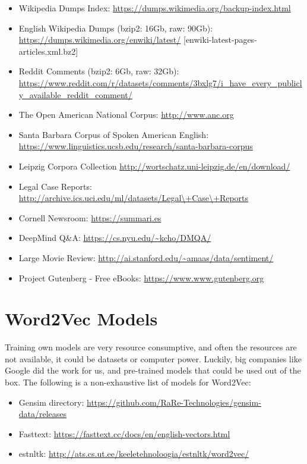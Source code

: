 \begin{itemize}
    \setlength\itemsep{0em}
    \item Wikipedia Dumps Index: \url{https://dumps.wikimedia.org/backup-index.html}
    \item English Wikipedia Dumps (bzip2: 16Gb, raw: 90Gb): \url{https://dumps.wikimedia.org/enwiki/latest/} [enwiki-latest-pages-articles.xml.bz2]
    \item Reddit Comments (bzip2: 6Gb, raw: 32Gb): \url{https://www.reddit.com/r/datasets/comments/3bxlg7/i_have_every_publicly_available_reddit_comment/}
    \item The Open American National Corpus: \url{http://www.anc.org}
    \item Santa Barbara Corpus of Spoken American English: \url{https://www.linguistics.ucsb.edu/research/santa-barbara-corpus}
    \item Leipzig Corpora Collection \url{http://wortschatz.uni-leipzig.de/en/download/}
    \item Legal Case Reports: \url{http://archive.ics.uci.edu/ml/datasets/Legal\+Case\+Reports}
    \item Cornell Newsroom: \url{https://summari.es}
    \item DeepMind Q\&A: \url{https://cs.nyu.edu/\~kcho/DMQA/}
    \item Large Movie Review: \url{http://ai.stanford.edu/\~amaas/data/sentiment/}
    \item Project Gutenberg - Free eBooks: \url{https://www.www.gutenberg.org}
\end{itemize}


\section{Word2Vec Models}
Training own models are very resource consumptive, and often the resources are not available, it could be datasets or computer power. Luckily, big companies like Google did the work for us, and pre-trained models that could be used out of the box. The following is a non-exhaustive list of models for Word2Vec:

\begin{itemize}
    \setlength\itemsep{0em}
    \item Gensim directory: \url{https://github.com/RaRe-Technologies/gensim-data/releases}
    \item Fasttext: \url{https://fasttext.cc/docs/en/english-vectors.html}
    \item estnltk: \url{http://ats.cs.ut.ee/keeletehnoloogia/estnltk/word2vec/}
\end{itemize}



